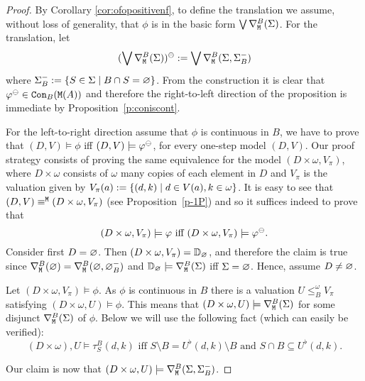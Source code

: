 \begin{proof}
By Corollary \ref{cor:ofopositivenf}, to define the translation we assume, without loss of generality, that $\phi$
is in the basic form $\bigvee \mondbnfofo{\Sigma}{B}$.
For the translation, let
\[
(\bigvee \mondbnfofo{\Sigma}{B})^\tcont \isdef 
\bigvee \mondgbnfofo{\Sigma}{\Sigma^{-}_{B}}{B}
\]
where $\Sigma^{-}_{B} \isdef \{S\in \Sigma \mid B \cap S = \nada \}$.
From the construction it is clear that $\phi^\tcont \in \cont{\ofo(A)}{B}$ and
therefore the right-to-left direction of the proposition is immediate by 
Proposition~\ref{p:coniscont}. 

For the left-to-right direction assume that $\phi$ is continuous in $B$, we have
to prove that $(D, V) \models \phi$ iff $(D, V) \models \phi^\tcont$, for every 
one-step model $(D, V)$.
Our proof strategy consists of proving the same equivalence for the model 
$(D\times \omega, V_\pi)$, where $D\times\omega$ consists of $\omega$ many 
copies of each element in $D$ and $V_\pi$ is the valuation given by $V_{\pi}(a) 
\isdef \{(d,k) \mid d\in  V(a), k\in\omega\}$.
It is easy to see that $(D, V) \equiv^{\ofo} (D\times \omega, V_\pi)$ (see 
Proposition~\ref{p-1P}) and so it suffices indeed to prove that
\[
(D\times\omega, V_\pi) \models \phi
\text{ iff }
(D\times\omega, V_\pi) \models \phi^\tcont.
\]
Consider first $D= \nada$.
Then $(D\times\omega, V_\pi) = \emodel$, and therefore the claim is true since 
$\mondbnfofo{\nada}{B} = \mondgbnfofo{\nada}{\nada^{-}_{B}}{B}$ and
$\emodel \models  \mondbnfofo{\Sigma}{B}$ iff $\Sigma=\nada$. 
Hence, assume $D \neq \nada$.
\bigskip

\noindent \fbox{$\Rightarrow$}
Let $(D\times\omega, V_\pi) \models \phi$.
As $\phi$ is continuous in $B$ there is a valuation $U \leq^{\omega}_{B} V_\pi$ 
satisfying $(D\times\omega, U) \models \phi$. 
This means that  $(D\times\omega, U) \models \mondbnfofo{\Sigma}{B}$ for some
disjunct $\mondbnfofo{\Sigma}{B}$ of $\phi$.
Below we will use the following fact (which can easily be verified):
\begin{equation}
\label{eq:con101}
(D\times\omega),U \models \tau^{B}_{S}(d,k) \text{ iff }
S \setminus B = U^{\flat}(d,k) \setminus B \text{ and }
S \cap B \subseteq U^{\flat}(d,k).
\end{equation}

Our claim is now that $(D\times\omega, U) \models 
\mondgbnfofo{\Sigma}{\Sigma^{-}_{B}}{B}$. 


\end{proof}
